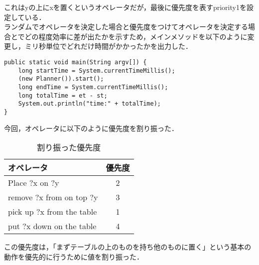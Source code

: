 \documentclass[a4j]{jarticle}
\begin{document}
これはyの上にxを置くというオペレータだが，最後に優先度を表すpriority1を設定している．\\
ランダムでオペレータを決定した場合と優先度をつけてオペレータを決定する場合とでどの程度効率に差が出たかを示すため，メインメソッドを以下のように変更し，ミリ秒単位でどれだけ時間がかかったかを出力した．\\
\begin{lstlisting}
public static void main(String argv[]) {
	long startTime = System.currentTimeMillis();
	(new Planner()).start();
	long endTime = System.currentTimeMillis();
	long totalTime = et - st;
	System.out.println("time:" + totalTime);
}
\end{lstlisting}
今回，オペレータに以下のように優先度を割り振った．\\
\begin{table}[H]
\begin{center}
\begin{tabular}{|l|c|}
\hline
オペレータ & 優先度 \\ \hline
Place ?x on ?y & 2 \\ \hline
remove ?x from on top ?y & 3 \\ \hline
pick up ?x from the table & 1 \\ \hline
put ?x down on the table & 4 \\ \hline
\end{tabular}
\end{center}
\caption{割り振った優先度}
\end{table}
この優先度は，「まずテーブルの上のものを持ち他のものに置く」という基本の動作を優先的に行うために値を割り振った．
\end{document}
